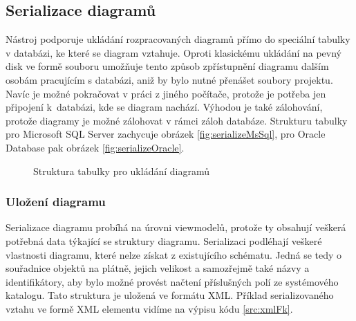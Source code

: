 \documentclass[czech,bachelor,public,dept460,male,oneside]{diploma}
\begin{document}
	\subsection{Serializace diagramů}
	Nástroj podporuje ukládání rozpracovaných diagramů přímo do speciální tabulky v databázi, ke které se diagram vztahuje. Oproti klasickému ukládání na pevný disk ve formě souboru umožňuje tento způsob zpřístupnění diagramu dalším osobám pracujícím s databázi, aniž by bylo nutné přenášet soubory projektu. Navíc je možné pokračovat v práci z jiného počítače, protože je potřeba jen připojení k~databázi, kde se diagram nachází. Výhodou je také zálohování, protože diagramy je možné zálohovat v rámci záloh databáze. Strukturu tabulky pro Microsoft SQL Server zachycuje obrázek \ref{fig:serializeMsSql}, pro Oracle Database pak obrázek \ref{fig:serializeOracle}.
	
	\begin{figure}[!h]
		\centering
		\qquad
		\caption{Struktura tabulky pro ukládání diagramů}
	\end{figure}
		
		\subsubsection{Uložení diagramu}
		Serializace diagramu probíhá na úrovni viewmodelů, protože ty obsahují veškerá potřebná data týkající se struktury diagramu. Serializaci podléhají veškeré vlastnosti diagramu, které nelze získat z existujícího schématu. Jedná se tedy o souřadnice objektů na plátně, jejich velikost a samozřejmě také názvy a identifikátory, aby bylo možné provést načtení příslušných polí ze systémového katalogu. Tato struktura je uložená ve formátu XML. Příklad serializovaného vztahu ve formě XML elementu vidíme na výpisu kódu \ref{src:xmlFk}.
		
\end{document}
